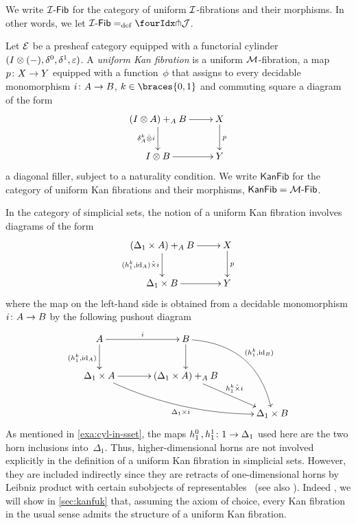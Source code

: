 \documentclass[reqno,10pt,a4paper,oneside,draft]{amsart}
\begin{document}
We write $\Fib{\cal{I}}$ for the category of uniform $\cal{I}$-fibrations and their morphisms.
In other words, we let $\Fib{\cal{I}} \defeq \liftr{\cal{J}}$.

\begin{example}
Let $\catE$ be a presheaf category equipped with a functorial cylinder $(\interval \otimes (-), \lcyl, \rcyl, \ccyl)$.
A \emph{uniform Kan fibration} is a uniform $\cal{M}$-fibration, \ie a map $p \co X \to Y$ equipped with a function~$\phi$ that assigns to every decidable monomorphism $i \co A \to B$, $k \in \braces{0, 1}$ and commuting square a diagram of the form
\[
\xymatrix{
  (\interval \otimes A) +_A B \ar[r] \ar[d]_{\kcyl_A \hatotimes i} & X \ar[d]^p \\
  \interval \otimes B \ar[r] & Y
}
\]
a diagonal filler, subject to a naturality condition. 
We write $\mathsf{KanFib}$ for the category of uniform Kan fibrations and their morphisms, \ie $\mathsf{KanFib} = \Fib{\cal{M}}$.
\end{example}

\begin{example}
In the category of simplicial sets, the notion of a uniform Kan fibration involves diagrams of the form
\[
\xymatrix{
  (\Delta_1 \times A) +_A B \ar[r] \ar[d]_{(h^k_1, \id_A) \hattimes i} & X \ar[d]^p \\
  \Delta_1 \times B \ar[r] & Y }
\]
where the map on the left-hand side is obtained from a decidable monomorphism $i \co A \to B$ by the following pushout diagram
\begin{gather*}
\xymatrix@C=1.2cm{
  A \ar[r]^{i} \ar[d]_{(h^k_1, \id_A)} & B \ar@/^2pc/[ddr]^{(h^k_1, \id_B)} \ar[d] & \\
  \Delta_1 \times A \ar@/_1pc/[drr]_{\Delta_1 \times i} \ar[r] & (\Delta_1 \times A) +_{A} B \ar[dr]^-{h^k_1 \hattimes i} & \\
  & & \Delta_1 \times B
}
\end{gather*}
As mentioned in \cref{exa:cyl-in-sset}, the maps $h^0_1 \, , h^1_1 \co 1 \to \Delta_1$ used here are the two horn inclusions into~$\Delta_1$.
Thus, higher-dimensional horns are not involved explicitly in the definition of a uniform Kan fibration in simplicial sets.
However, they are included indirectly since they are retracts of one-dimensional horns by Leibniz product with certain subobjects of representables~\cite{joyal-quaderns}  (see also \cite[Proposition 2.1.2.6]{lurie:htt}).
Indeed , we will show in \cref{sec:kanfuk} that, assuming the axiom of choice, every Kan fibration in the usual sense admits the structure of a uniform Kan fibration.
\end{example}
\end{document}
